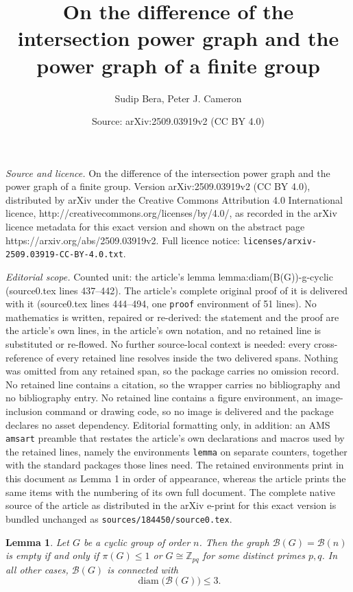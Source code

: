 \documentclass[10pt,a4paper]{amsart}
\title{On the difference of the intersection power graph and the power graph of a finite group}
\author{Sudip Bera, Peter J. Cameron}
\date{Source: arXiv:2509.03919v2 (CC BY 4.0)}
\newtheorem{lemma}{Lemma}
\begin{document}
\maketitle

\noindent\emph{Source and licence.} On the difference of the intersection power graph and the power graph of a finite group. Version arXiv:2509.03919v2 (CC BY 4.0), distributed by arXiv under the Creative Commons Attribution 4.0 International licence, http://creativecommons.org/licenses/by/4.0/, as recorded in the arXiv licence metadata for this exact version and shown on the abstract page https://arxiv.org/abs/2509.03919v2. Full licence notice: \texttt{licenses/arxiv-2509.03919-CC-BY-4.0.txt}.\par\smallskip

\noindent\textit{Editorial scope.} Counted unit: the article's lemma lemma:diam(B(G))-g-cyclic (source0.tex lines 437--442). The article's complete original proof of it is delivered with it (source0.tex lines 444--494, one \texttt{proof} environment of 51 lines). No mathematics is written, repaired or re-derived: the statement and the proof are the article's own lines, in the article's own notation, and no retained line is substituted or re-flowed.  No further source-local context is needed: every cross-reference of every retained line resolves inside the two delivered spans.  Nothing was omitted from any retained span, so the package carries no omission record.  No retained line contains a citation, so the wrapper carries no bibliography and no bibliography entry.  No retained line contains a figure environment, an image-inclusion command or drawing code, so no image is delivered and the package declares no asset dependency.  Editorial formatting only, in addition: an AMS \texttt{amsart} preamble that restates the article's own declarations and macros used by the retained lines, namely the environments \texttt{lemma} on separate counters, together with the standard packages those lines need.  The retained environments print in this document as Lemma 1 in order of appearance, whereas the article prints the same items with the numbering of its own full document.  The complete native source of the article as distributed in the arXiv e-print for this exact version is bundled unchanged as \texttt{sources/184450/source0.tex}.
\begin{lemma}\label{lemma:diam(B(G))-g-cyclic}
Let $G$ be a cyclic group of order $n$. Then the graph $\mathcal{B}(G) = \mathcal{B}(n)$ is empty if and only if $\pi(G) \leq 1$ or $G \cong \mathbb{Z}_{pq}$ for some distinct primes $p,q$. In all other cases, $\mathcal{B}(G)$ is connected with
\[
\operatorname{diam}\big(\mathcal{B}(G)\big) \leq 3.
\]
\end{lemma}
\end{document}
